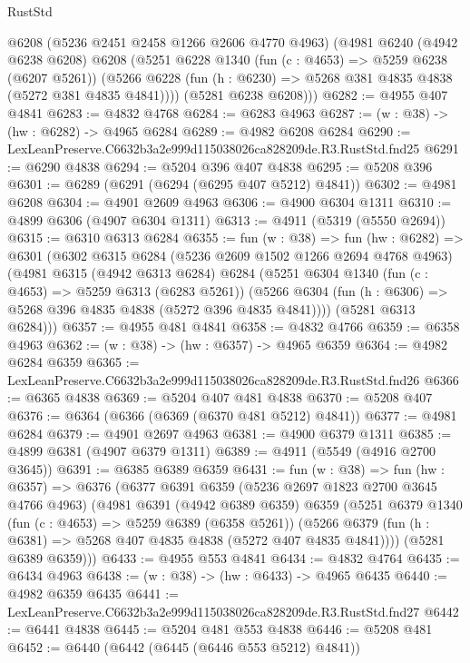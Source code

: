 \begin{lexlean}{RustStd}
\begin{coremodule}
      @6208
      (@5236 @2451 @2458 @1266 @2606 @4770 @4963)
      (@4981
        @6240
        (@4942 @6238 @6208)
        @6208
        (@5251
          @6228
          @1340
          (fun (c : @4653) => @5259 @6238 (@6207 @5261))
          (@5266 @6228 (fun (h : @6230) => @5268 @381 @4835 @4838 (@5272 @381 @4835 @4841))))
        (@5281 @6238 @6208)))
@6282 := @4955 @407 @4841
@6283 := @4832 @4768
@6284 := @6283 @4963
@6287 := (w : @38) -> (hw : @6282) -> @4965 @6284
@6289 := @4982 @6208 @6284
@6290 := LexLeanPreserve.C6632b3a2e999d115038026ca828209de.R3.RustStd.fnd25
@6291 := @6290 @4838
@6294 := @5204 @396 @407 @4838
@6295 := @5208 @396
@6301 := @6289 (@6291 (@6294 (@6295 @407 @5212) @4841))
@6302 := @4981 @6208
@6304 := @4901 @2609 @4963
@6306 := @4900 @6304 @1311
@6310 := @4899 @6306 (@4907 @6304 @1311)
@6313 := @4911 (@5319 (@5550 @2694))
@6315 := @6310 @6313 @6284
@6355 := fun (w : @38) =>
  fun (hw : @6282) =>
  @6301
    (@6302
      @6315
      @6284
      (@5236 @2609 @1502 @1266 @2694 @4768 @4963)
      (@4981
        @6315
        (@4942 @6313 @6284)
        @6284
        (@5251
          @6304
          @1340
          (fun (c : @4653) => @5259 @6313 (@6283 @5261))
          (@5266 @6304 (fun (h : @6306) => @5268 @396 @4835 @4838 (@5272 @396 @4835 @4841))))
        (@5281 @6313 @6284)))
@6357 := @4955 @481 @4841
@6358 := @4832 @4766
@6359 := @6358 @4963
@6362 := (w : @38) -> (hw : @6357) -> @4965 @6359
@6364 := @4982 @6284 @6359
@6365 := LexLeanPreserve.C6632b3a2e999d115038026ca828209de.R3.RustStd.fnd26
@6366 := @6365 @4838
@6369 := @5204 @407 @481 @4838
@6370 := @5208 @407
@6376 := @6364 (@6366 (@6369 (@6370 @481 @5212) @4841))
@6377 := @4981 @6284
@6379 := @4901 @2697 @4963
@6381 := @4900 @6379 @1311
@6385 := @4899 @6381 (@4907 @6379 @1311)
@6389 := @4911 (@5549 (@4916 @2700 @3645))
@6391 := @6385 @6389 @6359
@6431 := fun (w : @38) =>
  fun (hw : @6357) =>
  @6376
    (@6377
      @6391
      @6359
      (@5236 @2697 @1823 @2700 @3645 @4766 @4963)
      (@4981
        @6391
        (@4942 @6389 @6359)
        @6359
        (@5251
          @6379
          @1340
          (fun (c : @4653) => @5259 @6389 (@6358 @5261))
          (@5266 @6379 (fun (h : @6381) => @5268 @407 @4835 @4838 (@5272 @407 @4835 @4841))))
        (@5281 @6389 @6359)))
@6433 := @4955 @553 @4841
@6434 := @4832 @4764
@6435 := @6434 @4963
@6438 := (w : @38) -> (hw : @6433) -> @4965 @6435
@6440 := @4982 @6359 @6435
@6441 := LexLeanPreserve.C6632b3a2e999d115038026ca828209de.R3.RustStd.fnd27
@6442 := @6441 @4838
@6445 := @5204 @481 @553 @4838
@6446 := @5208 @481
@6452 := @6440 (@6442 (@6445 (@6446 @553 @5212) @4841))

\end{coremodule}
\end{lexlean}
